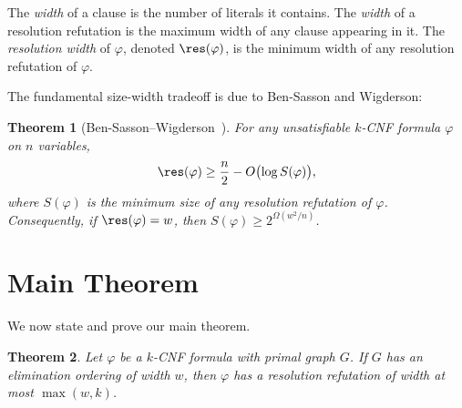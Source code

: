 \documentclass[11pt]{article}
\newtheorem{theorem}{Theorem}
\begin{document}
The \emph{width} of a clause is the number of literals it contains. The \emph{width} of a resolution refutation is the maximum width of any clause appearing in it. The \emph{resolution width} of $\varphi$, denoted $\res(\varphi)$, is the minimum width of any resolution refutation of $\varphi$.

The fundamental size-width tradeoff is due to Ben-Sasson and Wigderson:

\begin{theorem}[{Ben-Sasson--Wigderson~\cite{BW01}}]
\label{thm:bw}
For any unsatisfiable $k$-CNF formula $\varphi$ on $n$ variables,
\[
\res(\varphi) \geq \frac{n}{2} - O\bigl(\log S(\varphi)\bigr),
\]
where $S(\varphi)$ is the minimum size of any resolution refutation of $\varphi$. Consequently, if $\res(\varphi) = w$, then $S(\varphi) \geq 2^{\Omega(w^2/n)}$.
\end{theorem}

\section{Main Theorem}

We now state and prove our main theorem.

\begin{theorem}
\label{thm:main}
Let $\varphi$ be a $k$-CNF formula with primal graph $G$. If $G$ has an elimination ordering of width $w$, then $\varphi$ has a resolution refutation of width at most $\max(w, k)$.
\end{theorem}
\end{document}
